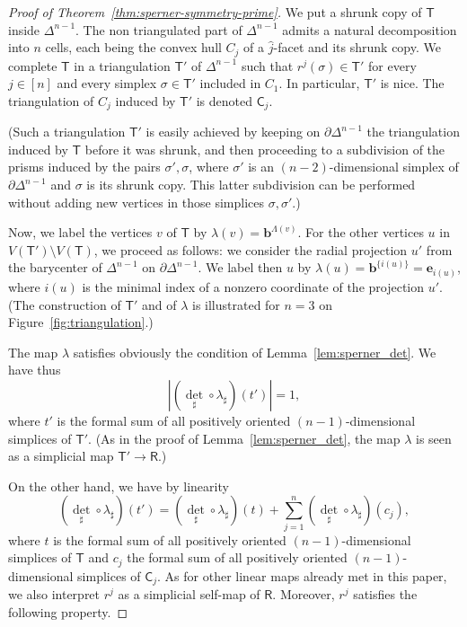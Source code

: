 \documentclass[12pt]{amsart}
\theoremstyle{definition}
\theoremstyle{remark}
\def\Rsf{\mathsf{R}}
\def\T{\mathsf{T}}
\def\C{\mathsf{C}}
\def\bb{\boldsymbol{b}}
\def\ee{\boldsymbol{e}}
\def\det{\operatorname{det}}
\begin{document}
\begin{proof}[Proof of Theorem~\ref{thm:sperner-symmetry-prime}]
We put a shrunk copy of $\T$ inside $\Delta^{n-1}$. The non triangulated part of $\Delta^{n-1}$ admits a natural decomposition into $n$ cells, each being the convex hull $C_j$ of a $\widehat j$-facet and its shrunk copy. We complete $\T$ in a triangulation $\T'$ of $\Delta^{n-1}$ such that  $r^j(\sigma)\in\T'$ for every $j\in[n]$ and every simplex $\sigma\in\T'$ included in $C_1$. In particular, $\T'$ is nice. The triangulation of $C_j$ induced by $\T'$ is denoted $\C_j$.

(Such a triangulation $\T'$ is easily achieved by keeping on $\partial\Delta^{n-1}$ the triangulation induced by $\T$ before it was shrunk, and then proceeding to a subdivision of the prisms induced by the pairs $\sigma',\sigma$, where $\sigma'$ is an $(n-2)$-dimensional simplex of $\partial\Delta^{n-1}$ and $\sigma$ is its shrunk copy. This latter subdivision can be performed without adding new vertices in those simplices $\sigma,\sigma'$.)

Now, we label the vertices $v$ of $\T$ by $\lambda(v)=\bb^{\Lambda(v)}$. For the other vertices $u$ in $V(\T')\setminus V(\T)$, we proceed as follows: we consider the radial projection $u'$ from the barycenter of $\Delta^{n-1}$ on $\partial\Delta^{n-1}$. We label then $u$ by $\lambda(u)=\bb^{\{i(u)\}}=\ee_{i(u)}$, where $i(u)$ is the minimal index of a nonzero coordinate of the projection $u'$. (The construction of $\T'$ and of $\lambda$ is illustrated for $n=3$ on Figure~\ref{fig:triangulation}.) 



The map $\lambda$ satisfies obviously the condition of Lemma~\ref{lem:sperner_det}. We have thus 
\begin{equation}\label{tprime} \left|(\det_{\sharp}\circ\lambda_{\sharp})(t')\right|=1,\end{equation} where $t'$ is the formal sum of all positively oriented $(n-1)$-dimensional simplices of $\T'$. (As in the proof of Lemma~\ref{lem:sperner_det}, the map $\lambda$ is seen as a simplicial map $\T'\rightarrow\Rsf$.)

On the other hand, we have by linearity 
\begin{equation}\label{decomp}
(\det_{\sharp}\circ\lambda_{\sharp})(t')=(\det_{\sharp}\circ\lambda_{\sharp})(t)+\sum_{j=1}^n(\det_{\sharp}\circ\lambda_{\sharp})(c_j),
\end{equation} where $t$ is the formal sum of all positively oriented $(n-1)$-dimensional simplices of $\T$ and $c_j$ the formal sum of all positively oriented $(n-1)$-dimensional simplices of $\C_j$.  As for other linear maps already met in this paper, we also  interpret $r^j$ as a simplicial self-map of $\Rsf$. Moreover, $r^j$ satisfies the following property.


\end{proof}
\end{document}
